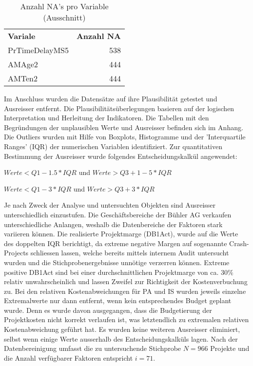 \begin{table}[htbp]
	\centering
	\caption{Anzahl NA's pro Variable (Ausschnitt)}
	\begin{tabular}{lr}
		\textbf{Variale} & \multicolumn{1}{l}{\textbf{Anzahl NA}} \\
		PrTimeDelayMS5 & 538 \\
		AMAge2 & 444 \\
		AMTen2 & 444 \\
	\end{tabular}%
	\label{tab:addlabel}%
\end{table}%
\newpage
Im Anschluss wurden die Datensätze auf ihre Plausibilität getestet und Ausreisser entfernt. Die Plausibilitätsüberlegungen basieren auf der logischen Interpretation und Herleitung der Indikatoren. Die Tabellen mit den Begründungen der unplausiblen Werte und Ausreisser befinden sich im Anhang. Die Outliers wurden mit Hilfe von Boxplots, Histogramme und der 'Interquartile Ranges' (IQR) der numerischen Variablen identifiziert. Zur quantitativen Bestimmung der Ausreisser wurde folgendes Entscheidungskalkül angewendet:
\newline\newline
\begin{centering}
	$ Werte < Q1 - 1.5 * IQR$ und $ Werte > Q3 + 1-5 * IQR$
\end{centering}
\newline\newline
\begin{centering}
	$ Werte < Q1 - 3 * IQR$ und $ Werte > Q3 + 3 * IQR$
\end{centering}
\newline\newline
Je nach Zweck der Analyse und untersuchten Objekten sind Ausreisser unterschiedlich einzustufen. Die Geschäftsbereiche der Bühler AG verkaufen unterschiedliche Anlangen, weshalb die Datenbereiche der Faktoren stark variieren können. Die realisierte Projektmarge (DB1Act), wurde auf die Werte des doppelten IQR berichtigt, da extreme negative Margen auf sogenannte Crash-Projects schliessen lassen, welche bereits mittels internem Audit untersucht wurden und die Stichprobenergebnisse unnötige verzerren können. Extreme positive DB1Act sind bei einer durchschnittlichen Projektmarge von ca. 30\% relativ unwahrscheinlich und lassen Zweifel zur Richtigkeit der Kostenverbuchung zu. Bei den relativen Kostenabweichungen für PA und IS wurden jeweils einzelne Extremalwerte nur dann entfernt, wenn kein entsprechendes Budget geplant wurde. Denn es wurde davon ausgegangen, dass die Budgetierung der Projektkosten nicht korrekt verlaufen ist, was letztendlich zu extremalen relativen Kostenabweichung geführt hat. Es wurden keine weiteren Ausreisser eliminiert, selbst wenn einige Werte ausserhalb des Entscheidungskalküls lagen. Nach der Datenbereinigung umfasst die zu untersuchende Stichprobe $N = 966$ Projekte und die Anzahl verfügbarer Faktoren entspricht $ i = 71$. 
